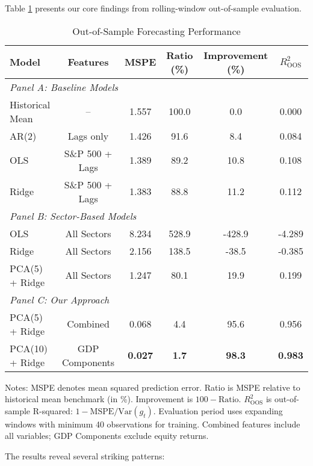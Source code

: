 \documentclass[11pt,letterpaper]{article}
\theoremstyle{plain}
\theoremstyle{definition}
\theoremstyle{remark}
\begin{document}
Table \ref{tab:main_results} presents our core findings from rolling-window out-of-sample evaluation.

\begin{table}[htbp]
\centering
\caption{Out-of-Sample Forecasting Performance}
\label{tab:main_results}
\begin{tabular}{lccccc}
\toprule
Model & Features & MSPE & Ratio (\%) & Improvement (\%) & $R^2_{\text{OOS}}$ \\
\midrule
\multicolumn{6}{l}{\textit{Panel A: Baseline Models}} \\
Historical Mean & -- & 1.557 & 100.0 & 0.0 & 0.000 \\
AR(2) & Lags only & 1.426 & 91.6 & 8.4 & 0.084 \\
OLS & S\&P 500 + Lags & 1.389 & 89.2 & 10.8 & 0.108 \\
Ridge & S\&P 500 + Lags & 1.383 & 88.8 & 11.2 & 0.112 \\
\midrule
\multicolumn{6}{l}{\textit{Panel B: Sector-Based Models}} \\
OLS & All Sectors & 8.234 & 528.9 & -428.9 & -4.289 \\
Ridge & All Sectors & 2.156 & 138.5 & -38.5 & -0.385 \\
PCA(5) + Ridge & All Sectors & 1.247 & 80.1 & 19.9 & 0.199 \\
\midrule
\multicolumn{6}{l}{\textit{Panel C: Our Approach}} \\
PCA(5) + Ridge & Combined & 0.068 & 4.4 & 95.6 & 0.956 \\
PCA(10) + Ridge & GDP Components & \textbf{0.027} & \textbf{1.7} & \textbf{98.3} & \textbf{0.983} \\
\bottomrule
\end{tabular}
\begin{tablenotes}
\small
\item Notes: MSPE denotes mean squared prediction error. Ratio is MSPE relative to historical mean benchmark (in \%). Improvement is $100 - \text{Ratio}$. $R^2_{\text{OOS}}$ is out-of-sample R-squared: $1 - \text{MSPE}/\text{Var}(g_t)$. Evaluation period uses expanding windows with minimum 40 observations for training. Combined features include all variables; GDP Components exclude equity returns.
\end{tablenotes}
\end{table}

The results reveal several striking patterns:
\end{document}

